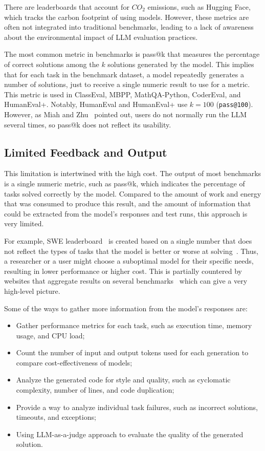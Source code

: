 There are leaderboards that account for $CO_2$ emissions, such as Hugging Face\cite{huggingfaceCalculation}, which tracks the carbon footprint of using models.
However, these metrics are often not integrated into traditional benchmarks, leading to a lack of awareness about the environmental impact of LLM evaluation practices.

The most common metric in benchmarks is pass@k that measures the percentage of correct solutions among the $k$ solutions generated by the model.
This implies that for each task in the benchmark dataset, a model repeatedly generates a number of solutions, just to receive a single numeric result to use for a metric.
This metric is used in ClassEval, MBPP, MathQA-Python, CoderEval, and HumanEval+.
Notably, HumanEval and HumanEval+ use $k=100$ (\texttt{pass@100}).
However, as Miah and Zhu~\cite{miah2024usercentricevaluationcode} pointed out, users do not normally run the LLM several times, so pass@k does not reflect its usability.

\subsection{Limited Feedback and Output}

This limitation is intertwined with the high cost.
The output of most benchmarks is a single numeric metric, such as pass@k, which indicates the percentage of tasks solved correctly by the model.
Compared to the amount of work and energy that was consumed to produce this result, and the amount of information that could be extracted from the model's responses and test runs, this approach is very limited.

For example, SWE leaderboard~\cite{swebenchSWEbenchLeaderboards} is created based on a single number that does not reflect the types of tasks that the model is better or worse at solving~\cite{miah2024usercentricevaluationcode}.
Thus, a researcher or a user might choose a suboptimal model for their specific needs, resulting in lower performance or higher cost.
This is partially countered by websites that aggregate results on several benchmarks~\cite{vellumLeaderboard2025} which can give a very high-level picture.

Some of the ways to gather more information from the model's responses are:
\begin{itemize}
    \item Gather performance metrics for each task, such as execution time, memory usage, and CPU load;
    \item Count the number of input and output tokens used for each generation to compare cost-effectiveness of models;
    \item Analyze the generated code for style and quality, such as cyclomatic complexity, number of lines, and code duplication;
    \item Provide a way to analyze individual task failures, such as incorrect solutions, timeouts, and exceptions;
    \item Using LLM-as-a-judge approach to evaluate the quality of the generated solution.
\end{itemize}

